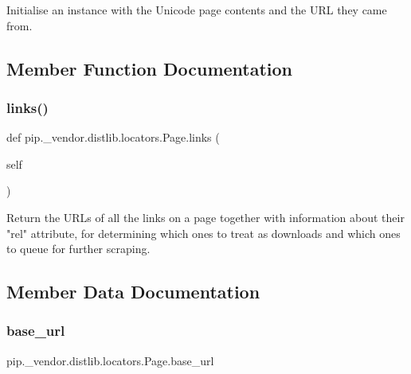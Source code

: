 \begin{DoxyVerb}Initialise an instance with the Unicode page contents and the URL they
came from.
\end{DoxyVerb}
 

\subsection{Member Function Documentation}
\mbox{\label{classpip_1_1__vendor_1_1distlib_1_1locators_1_1Page_a9f601ca69162baf958e39b9b17dabe71}} 
\subsubsection{\texorpdfstring{links()}{links()}}
{\footnotesize\ttfamily def pip.\+\_\+vendor.\+distlib.\+locators.\+Page.\+links (\begin{DoxyParamCaption}\item[{}]{self }\end{DoxyParamCaption})}

\begin{DoxyVerb}Return the URLs of all the links on a page together with information
about their "rel" attribute, for determining which ones to treat as
downloads and which ones to queue for further scraping.
\end{DoxyVerb}
 

\subsection{Member Data Documentation}
\mbox{\label{classpip_1_1__vendor_1_1distlib_1_1locators_1_1Page_a6daf04947e3fe072f38baa6af6e7016a}} 
\subsubsection{\texorpdfstring{base\+\_\+url}{base\_url}}
{\footnotesize\ttfamily pip.\+\_\+vendor.\+distlib.\+locators.\+Page.\+base\+\_\+url}

